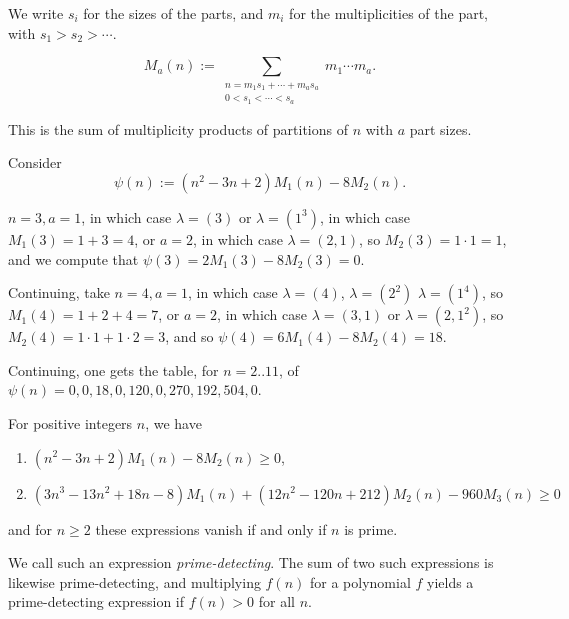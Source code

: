 \documentclass[reqno]{amsart} 
\begin{document}
We write $s_i$ for the sizes of the parts, and $m_i$ for the multiplicities of the part, with $s_1 > s_2 > \dotsb$.
\begin{definition}[MacMahon 1920]
  \begin{equation*}
    M_a(n) := \sum_{
      \substack{
        n = m_1 s_1 + \dotsb + m_a s_a  \\
        0 < s_1 < \dotsb < s_a
      }
    } m_1 \dotsb m_a.
  \end{equation*}
\end{definition}
\begin{remark}
  This is the sum of multiplicity products of partitions of $n$ with $a$ part sizes.
\end{remark}
Consider
\begin{equation*}
  \psi(n) :=(n^2 - 3 n + 2) M_1(n) - 8 M_2(n).
\end{equation*}
\begin{example}
  $n = 3, a = 1$, in which case $\lambda =(3)$ or $\lambda =(1^3)$, in which case $M_1(3) = 1 + 3 = 4$,
  or $a = 2$, in which case $\lambda =(2, 1)$, so $M_2(3) = 1 \cdot 1 = 1$, and we compute that $\psi(3) = 2 M_1(3) - 8 M_2(3) = 0$.

  Continuing, take $n = 4, a = 1$, in which case $\lambda = (4)$, $\lambda = (2^2)$ $\lambda =(1^4)$, so $M_1(4) = 1 + 2 + 4 = 7$,
  or $a = 2$, in which case $\lambda =(3, 1)$ or $\lambda =(2, 1^2)$, so $M_2(4) = 1 \cdot 1 + 1 \cdot 2 = 3$, and so $\psi(4) = 6 M_1(4) - 8 M_2(4) = 18$.

  Continuing, one gets the table, for $n = 2..11$, of $\psi(n) = 0, 0, 18, 0, 120, 0, 270, 192, 504, 0$.
\end{example}

\begin{theorem} For positive integers $n$, we have
  \begin{enumerate}
  \item $(n^2 - 3 n + 2) M_1(n) - 8 M_2(n) \geq 0$,
  \item $(3 n^3 - 13 n^2 + 18 n - 8) M_1(n) +(12 n^2 - 120 n + 212) M_2(n) - 960 M_3(n) \geq 0$
  \end{enumerate}
  and for $n \geq 2$ these expressions vanish if and only if $n$ is prime.
\end{theorem}
\begin{remark}
  We call such an expression \emph{prime-detecting}.  The sum of two such expressions is likewise prime-detecting, and multiplying $f(n)$ for a polynomial $f$ yields a prime-detecting expression if $f(n) > 0$ for all $n$.
\end{remark}
\end{document}
